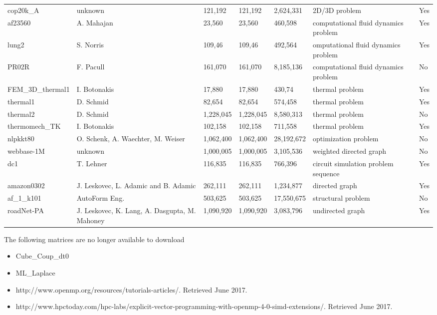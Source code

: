 \documentclass{scrreprt}
\begin{document}
\begin{longtable}[h!]{ |s|p{2cm}|p{0.4cm}|p{0.4cm}|p{0.5cm}|p{2cm}|p{0.6cm}|  }
cop20k_A & unknown &121,192 & 121,192 &2,624,331& 	2D/3D problem &  Yes   \\
af23560 & 	A. Mahajan &23,560 & 23,560 &460,598 & computational fluid dynamics problem &  Yes   \\
lung2 & S. Norris &109,46 &109,46 &492,564 & omputational fluid dynamics problem &  Yes   \\
PR02R & F. Pacull &161,070& 161,070 &8,185,136 & computational fluid dynamics problem &  No   \\
FEM_3D_thermal1 & 	I. Botonakis &17,880 & 17,880 &430,74 & thermal problem&  Yes   \\
thermal1 & D. Schmid &82,654 & 82,654 &574,458 & thermal problem &  Yes   \\
thermal2 & 	D. Schmid &1,228,045 & 1,228,045 &8,580,313& thermal problem &  No   \\
thermomech_TK & I. Botonakis &102,158& 102,158 &711,558& thermal problem &  Yes   \\
nlpkkt80 & O. Schenk, A. Waechter, M. Weiser &1,062,400 & 1,062,400 &28,192,672 & optimization problem &  No   \\
webbase-1M & 	unknown &1,000,005 & 1,000,005 &3,105,536 & weighted directed graph &  No   \\
dc1 & T. Lehner &116,835 & 116,835 &766,396 & circuit simulation problem sequence& Yes   \\
amazon0302 & 	J. Leskovec, L. Adamic and B. Adamic &262,111 & 262,111 &1,234,877 & directed graph &  Yes   \\
af_1_k101 & AutoForm Eng. &503,625 & 503,625 &17,550,675 & structural problem &  No   \\
roadNet-PA & 	J. Leskovec, K. Lang, A. Dasgupta, M. Mahoney &1,090,920 & 1,090,920 &3,083,796 & 	undirected graph &  Yes   \\

\hline
\end{longtable}
\FloatBarrier




The following matrices are no longer available to download
\begin{itemize}
\item Cube_Coup_dt0
\item ML_Laplace
\item http://www.openmp.org/resources/tutorials-articles/. Retrieved June 2017.
\item http://www.hpctoday.com/hpc-labs/explicit-vector-programming-with-openmp-4-0-simd-extensions/. Retrieved June 2017.
\end{itemize}
\end{document}
